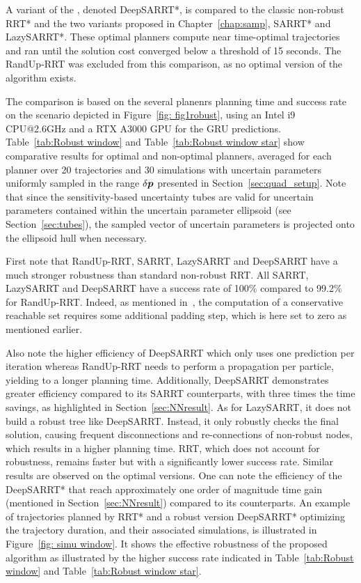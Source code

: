 A  variant of the , denoted DeepSARRT*, is compared to the classic non-robust RRT* and the two variants proposed in Chapter~\ref{chap:samp}, SARRT* and LazySARRT*. 
These optimal planners compute near time-optimal trajectories and ran until the solution cost converged below a threshold of 15 seconds. 
The RandUp-RRT was excluded from this comparison, as no optimal version of the algorithm exists.

The comparison is based on the several planenrs planning time and success rate on the scenario depicted in Figure~\ref{fig: fig1robust}, using an Intel i9 CPU@2.6GHz and a RTX A3000 GPU for the GRU predictions.
Table~\ref{tab:Robust window} and Table~\ref{tab:Robust window star} show comparative results for optimal and non-optimal planners, averaged for each planner over 20 trajectories and 30 simulations with uncertain parameters uniformly sampled in the range $\delta\boldsymbol{p}$ presented in Section~\ref{sec:quad_setup}. 
Note that since the sensitivity-based uncertainty tubes are valid for uncertain parameters contained within the uncertain parameter ellipsoid (see Section~\ref{sec:tubes}), the sampled vector of uncertain parameters is projected onto the ellipsoid hull when necessary.

First note that RandUp-RRT, SARRT, LazySARRT and DeepSARRT have a much stronger robustness than standard non-robust RRT. 
All SARRT, LazySARRT and DeepSARRT have a success rate of 100\% compared to 99.2\% for RandUp-RRT. 
Indeed, as mentioned in~\cite{cRandUpRRT, cRandUP}, the computation of a conservative reachable set requires some additional padding step, which is here set to zero as mentioned earlier.

Also note the higher efficiency of DeepSARRT which only uses one prediction per iteration whereas RandUp-RRT needs to perform a propagation per particle, yielding to a longer planning time. 
Additionally, DeepSARRT demonstrates greater efficiency compared to its SARRT counterparts, with three times the time savings, as highlighted in Section~\ref{sec:NNresult}.
As for LazySARRT, it does not build a robust tree like DeepSARRT. 
Instead, it only robustly checks the final solution, causing frequent disconnections and re-connections of non-robust nodes, which results in a higher planning time.
RRT, which does not account for robustness, remains faster but with a significantly lower success rate. 
Similar results are observed on the optimal versions. 
One can note the efficiency of the DeepSARRT* that reach approximately one order of magnitude time gain (mentioned in Section~\ref{sec:NNresult}) compared to its  counterparts. 
An example of trajectories planned by RRT* and a robust version DeepSARRT* optimizing the trajectory duration, and their associated simulations, is illustrated in Figure~\ref{fig: simu window}.
It shows the effective robustness of the proposed algorithm as illustrated by the higher success rate indicated in Table~\ref{tab:Robust window} and Table~\ref{tab:Robust window star}.

